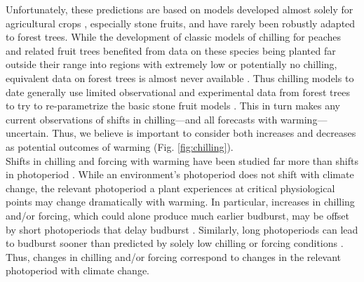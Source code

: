 \documentclass[11pt,letter]{article}
\begin{document}
Unfortunately, these predictions are based on models developed almost solely for agricultural crops \citep[but see][]{harrington2015}, especially stone fruits, and have rarely been robustly adapted to forest trees. While the development of classic models of chilling for peaches and related fruit trees benefited from data on these species being planted far outside their range into regions with extremely low or potentially no chilling, equivalent data on forest trees is almost never available \citep{dennis2003}. Thus chilling models to date generally use limited observational and experimental data from forest trees to try to re-parametrize the basic stone fruit models \citep{Chuine2000,chuine2016}. This in turn makes any current observations of shifts in chilling---and all forecasts with warming---uncertain. Thus, we believe is important to consider both increases and decreases as potential outcomes of warming (Fig. \ref{fig:chilling}). \\

Shifts in chilling and forcing with warming have been studied far more than shifts in photoperiod \citep[but see][]{saikkonen2012,way2015}. While an environment's photoperiod does not shift with climate change, the relevant photoperiod a plant experiences at critical physiological points may change dramatically with warming. In particular, increases in chilling and/or forcing, which could alone produce much earlier budburst, may be offset by short photoperiods that delay budburst \citep{gauzere2019}. Similarly, long photoperiods can lead to budburst sooner than predicted by solely low chilling or forcing conditions \citep{Nienstaedt:1966aa,Myking:1995,Partanen:1998aa}. Thus, changes in chilling and/or forcing correspond to changes in the relevant photoperiod with climate change. \\
\end{document}
